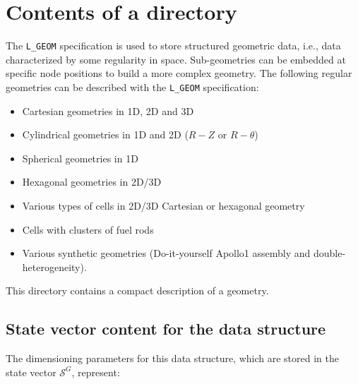 \section{Contents of a
 directory}\label{sect:geometrydir}

The {\tt L\_GEOM} specification is used to store structured geometric data, i.e., data characterized by some regularity in space. Sub-geometries can be embedded at specific node positions to build a more complex geometry. The following regular geometries can be described with the {\tt L\_GEOM} specification:
\begin{itemize}
\item Cartesian geometries in 1D, 2D and 3D
\item Cylindrical geometries in 1D and 2D ($R-Z$ or $R-\theta$)
\item Spherical geometries in 1D
\item Hexagonal geometries in 2D/3D
\item Various types of cells in 2D/3D Cartesian or hexagonal geometry
\item Cells with clusters of fuel rods
\item Various synthetic geometries (Do-it-yourself Apollo1 assembly and double-heterogeneity).
\end{itemize}

This directory contains a compact description of a geometry.

\subsection{State vector content for the  data structure}\label{sect:geometrystate}

The dimensioning parameters for this data structure, which are stored in the state vector
$\mathcal{S}^{G}$, represent:

